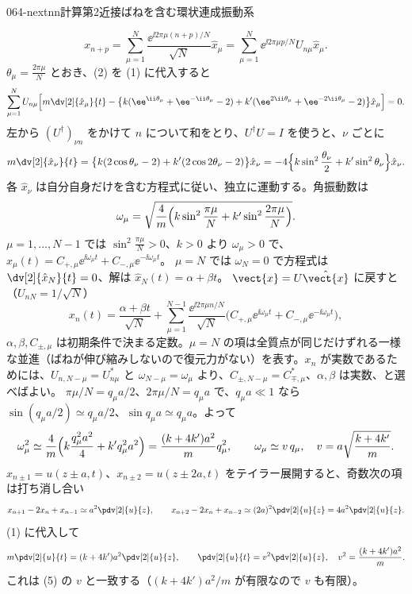 \documentclass[uplatex,dvipdfmx,a4paper,11pt]{jsarticle}
\begin{document}
\begin{mondai}{064-nextnn}{計算}{第2近接ばねを含む環状連成振動系}
\begin{tadashii}
\[
x_{n+p}=\sum_{\mu=1}^{N}\frac{\ee^{\ii2\pi\mu(n+p)/N}}{\sqrt{N}}\hat{x}_{\mu}=\sum_{\mu=1}^{N}\ee^{\ii2\pi\mu p/N}U_{n\mu}\hat{x}_{\mu}.
\]
 $\theta_{\mu}=\frac{2\pi\mu}{N}$ とおき、(2) を (1) に代入すると
\[
\sum_{\mu=1}^{N}U_{n\mu}\Bigl[m\dv[2]{\hat{x}_{\mu}}{t}-\bigl\{k(\ee^{\ii\theta_{\mu}}+\ee^{-\ii\theta_{\mu}}-2)+k'(\ee^{2\ii\theta_{\mu}}+\ee^{-2\ii\theta_{\mu}}-2)\bigr\}\hat{x}_{\mu}\Bigr]=0 .
\]
左から $(U^{\dagger})_{\nu n}$ をかけて $n$ について和をとり、$U^{\dagger}U=I$ を使うと、$\nu$ ごとに
\[
m\dv[2]{\hat{x}_{\nu}}{t}=\bigl\{k(2\cos\theta_{\nu}-2)+k'(2\cos2\theta_{\nu}-2)\bigr\}\hat{x}_{\nu}=-4\Bigl\{k\sin^{2}\frac{\theta_{\nu}}{2}+k'\sin^{2}\theta_{\nu}\Bigr\}\hat{x}_{\nu}.
\]
各 $\hat{x}_{\nu}$ は自分自身だけを含む方程式に従い、独立に運動する。角振動数は
\[
\omega_{\mu}=\sqrt{\frac{4}{m}\Bigl(k\sin^{2}\frac{\pi\mu}{N}+k'\sin^{2}\frac{2\pi\mu}{N}\Bigr)} .
\]
 $\mu=1,\dots,N-1$ では $\sin^{2}\frac{\pi\mu}{N}>0$、$k>0$ より $\omega_{\mu}>0$ で、$\hat{x}_{\mu}(t)=C_{+,\mu}\ee^{\ii\omega_{\mu}t}+C_{-,\mu}\ee^{-\ii\omega_{\mu}t}$。
$\mu=N$ では $\omega_N=0$ で方程式は $\dv[2]{\hat{x}_N}{t}=0$、解は $\hat{x}_N(t)=\alpha+\beta t$。
$\vect{x}=U\hat{\vect{x}}$ に戻すと（$U_{nN}=1/\sqrt{N}$）
\[
x_n(t)=\frac{\alpha+\beta t}{\sqrt{N}}+\sum_{\mu=1}^{N-1}\frac{\ee^{\ii2\pi\mu n/N}}{\sqrt{N}}\bigl(C_{+,\mu}\ee^{\ii\omega_{\mu}t}+C_{-,\mu}\ee^{-\ii\omega_{\mu}t}\bigr),
\]
$\alpha,\beta,C_{\pm,\mu}$ は初期条件で決まる定数。$\mu=N$ の項は全質点が同じだけずれる一様な並進（ばねが伸び縮みしないので復元力がない）を表す。$x_n$ が実数であるためには、$U_{n,N-\mu}=U_{n\mu}^{*}$ と $\omega_{N-\mu}=\omega_{\mu}$ より、$C_{\pm,N-\mu}=C_{\mp,\mu}^{*}$、$\alpha,\beta$ は実数、と選べばよい。
 $\pi\mu/N=q_{\mu}a/2$、$2\pi\mu/N=q_{\mu}a$ で、$q_{\mu}a\ll1$ なら $\sin(q_{\mu}a/2)\simeq q_{\mu}a/2$、$\sin q_{\mu}a\simeq q_{\mu}a$。よって
\[
\omega_{\mu}^{2}\simeq\frac{4}{m}\Bigl(k\frac{q_{\mu}^{2}a^{2}}{4}+k'q_{\mu}^{2}a^{2}\Bigr)=\frac{(k+4k')a^{2}}{m}q_{\mu}^{2},\qquad \omega_{\mu}\simeq v\,q_{\mu},\quad v=a\sqrt{\frac{k+4k'}{m}} .
\]
 $x_{n\pm1}=u(z\pm a,t)$、$x_{n\pm2}=u(z\pm2a,t)$ をテイラー展開すると、奇数次の項は打ち消し合い
\[
x_{n+1}-2x_n+x_{n-1}\simeq a^{2}\pdv[2]{u}{z},\qquad x_{n+2}-2x_n+x_{n-2}\simeq(2a)^{2}\pdv[2]{u}{z}=4a^{2}\pdv[2]{u}{z}.
\]
(1) に代入して
\[
m\pdv[2]{u}{t}=(k+4k')a^{2}\pdv[2]{u}{z},\qquad \pdv[2]{u}{t}=v^{2}\pdv[2]{u}{z},\quad v^{2}=\frac{(k+4k')a^{2}}{m}.
\]
これは (5) の $v$ と一致する（$(k+4k')a^{2}/m$ が有限なので $v$ も有限）。

\end{tadashii}
\end{mondai}
\end{document}
